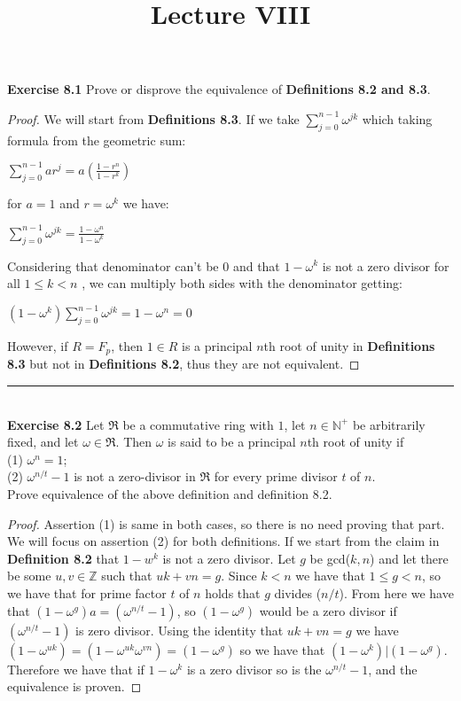 \documentclass[a4paper]{article}
\title{\vspace{-2cm}Lecture VIII\vspace{-2cm}}
\date{}
\begin{document}
\maketitle
\noindent \textbf{Exercise 8.1}  Prove or disprove the equivalence of \textbf{Definitions 8.2 and 8.3}.
\begin{proof}
We will start from \textbf{Definitions 8.3}. If we take $\sum_{j=0}^{n-1}\omega^{jk}$ which taking formula from the geometric sum:
\begin{center}
$\sum_{j=0}^{n-1}ar^{j}=a\left( \frac{1- r^{n}}{1- r^{k}}\right)$
\end{center}
for $a = 1$ and $r = \omega^{k}$ we have:
\begin{center}
$\sum_{j=0}^{n-1}\omega^{jk}=\frac{1- \omega^{n}}{1- \omega^{k}}$
\end{center}
Considering that denominator can't be 0 and that ${1- \omega^{k}}$ is not a zero divisor for all $1 \leq k < n$ , we can multiply both sides with the denominator getting:
\begin{center}
$\left(1- \omega^{k}\right)\sum_{j=0}^{n-1}\omega^{jk}={1- \omega^{n}}=0$
\end{center}
However, if $R=F_{p}$, then $1 \in R$ is a principal $n$th root of unity in \textbf{Definitions 8.3} but not in \textbf{Definitions 8.2}, thus they are not equivalent.
\end{proof}



\noindent\rule{12cm}{0.4pt}\\
\noindent \textbf{Exercise 8.2}  Let $\mathfrak{R}$ be a commutative ring with $1$, let $n \in \mathbb{N}^{+}$ be arbitrarily fixed, and let $\omega \in \mathfrak{R}$. Then $\omega$ is said to be a principal $n$th root of unity if\\
(1) $\omega^{n} =1$;\\
(2) $\omega^{n/t}-1$ is not a zero-divisor in $\mathfrak{R}$ for every prime divisor $t$ of $n$.\\
Prove equivalence of the above definition and definition 8.2.
\begin{proof}
Assertion (1) is same in both cases, so there is no need proving that part. We will focus on assertion (2) for both definitions. If we start from the claim in \textbf{Definition 8.2} that $1 - w^{k}$ is not a zero divisor. Let $g$ be gcd($k,n$) and let there be some $u,v \in \mathbb{Z}$ such that $uk + vn = g$. Since $k<n$ we have that $1 \leq g < n$, so we have that for prime factor $t$ of $n$ holds that $g$ divides ($n/t$). From here we have that $(1 - \omega^{g})a = (\omega^{n/t}-1)$, so $(1 - \omega^{g})$ would be a zero divisor if $(\omega^{n/t}-1)$ is zero divisor. Using the identity that $uk + vn = g$ we have $(1 - \omega^{uk})=(1 - \omega^{uk}\omega^{vn})=(1 - \omega^{g})$ so we have that $(1 - \omega^{k}) | (1 - \omega^{g})$. Therefore we have that if $1 - \omega^{k}$ is a zero divisor so is the $\omega^{n/t}-1$, and the equivalence is proven.
\end{proof}
\end{document}
